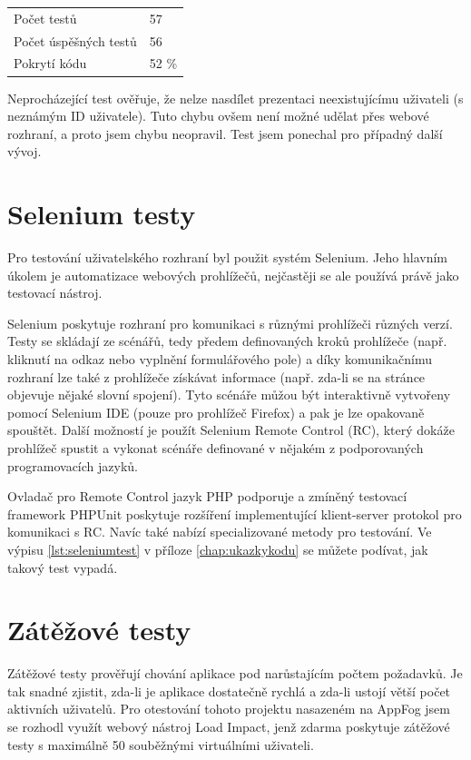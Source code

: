 \documentclass[11pt,twoside,a4paper]{book}
\begin{document}
\begin{table}[H]
    \center \begin{tabular}{ll}
    Počet testů           & 57  \\
    Počet úspěšných testů & 56  \\
    Pokrytí kódu          & 52 \%  \\
    \end{tabular}
\end{table}

Neprocházející test ověřuje, že nelze nasdílet prezentaci neexistujícímu uživateli (s neznámým ID uživatele). Tuto chybu ovšem není možné udělat přes webové rozhraní, a proto jsem chybu neopravil. Test jsem ponechal pro případný další vývoj.

\section{Selenium testy}
Pro testování uživatelského rozhraní byl použit systém Selenium\citep{selenium}. Jeho hlavním úkolem je automatizace webových prohlížečů, nejčastěji se ale používá právě jako testovací nástroj. 

Selenium poskytuje rozhraní pro komunikaci s různými prohlížeči různých verzí. Testy se skládají ze scénářů, tedy předem definovaných kroků prohlížeče (např. kliknutí na odkaz nebo vyplnění formulářového pole) a díky komunikačnímu rozhraní lze také z prohlížeče získávat informace (např. zda-li se na stránce objevuje nějaké slovní spojení). Tyto scénáře můžou být interaktivně vytvořeny pomocí Selenium IDE (pouze pro prohlížeč Firefox) a pak je lze opakovaně spouštět. Další možností je použít Selenium Remote Control (RC), který dokáže prohlížeč spustit a vykonat scénáře definované v nějakém z podporovaných programovacích jazyků.

Ovladač pro Remote Control jazyk PHP podporuje a zmíněný testovací framework PHPUnit poskytuje rozšíření implementující klient-server protokol pro komunikaci s RC. Navíc také nabízí specializované metody pro testování. Ve výpisu \ref{lst:seleniumtest} v příloze \ref{chap:ukazkykodu} se můžete podívat, jak takový test vypadá.

\section{Zátěžové testy}
Zátěžové testy prověřují chování aplikace pod narůstajícím počtem požadavků. Je tak snadné zjistit, zda-li je aplikace dostatečně rychlá a zda-li ustojí větší počet aktivních uživatelů. Pro otestování tohoto projektu nasazeném na AppFog jsem se rozhodl využít webový nástroj Load Impact\cite{loadimpact}, jenž zdarma poskytuje zátěžové testy s maximálně 50 souběžnými virtuálními uživateli. 
\end{document}
